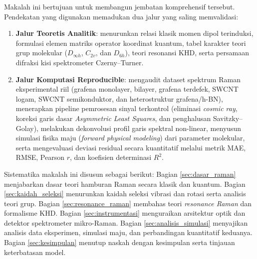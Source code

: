 Makalah ini bertujuan untuk membangun jembatan komprehensif tersebut. Pendekatan yang digunakan memadukan dua jalur yang saling memvalidasi:
\begin{enumerate}
    \item \textbf{Jalur Teoretis Analitik}: menurunkan relasi klasik momen dipol terinduksi, formulasi elemen matriks operator koordinat kuantum, tabel karakter teori grup molekular ($D_{\infty h}$, $C_{2v}$, dan $D_{6h}$), teori resonansi KHD, serta persamaan difraksi kisi spektrometer Czerny--Turner.
    \item \textbf{Jalur Komputasi Reproducible}: mengaudit dataset spektrum Raman eksperimental riil (grafena monolayer, bilayer, grafena terdefek, SWCNT logam, SWCNT semikonduktor, dan heterostruktur grafena/h-BN), menerapkan pipeline pemrosesan sinyal terkontrol (eliminasi \textit{cosmic ray}, koreksi garis dasar \textit{Asymmetric Least Squares}, dan penghalusan Savitzky--Golay), melakukan dekonvolusi profil garis spektral non-linear, menyusun simulasi fisika maju (\textit{forward physical modeling}) dari parameter molekular, serta mengevaluasi deviasi residual secara kuantitatif melalui metrik MAE, RMSE, Pearson $r$, dan koefisien determinasi $R^2$.
\end{enumerate}

Sistematika makalah ini disusun sebagai berikut: Bagian \ref{sec:dasar_raman} menjabarkan dasar teori hamburan Raman secara klasik dan kuantum. Bagian \ref{sec:kaidah_seleksi} menurunkan kaidah seleksi vibrasi dan rotasi serta analisis teori grup. Bagian \ref{sec:resonance_raman} membahas teori \textit{resonance Raman} dan formalisme KHD. Bagian \ref{sec:instrumentasi} menguraikan arsitektur optik dan detektor spektrometer mikro-Raman. Bagian \ref{sec:analisis_simulasi} menyajikan analisis data eksperimen, simulasi maju, dan perbandingan kuantitatif keduanya. Bagian \ref{sec:kesimpulan} menutup naskah dengan kesimpulan serta tinjauan keterbatasan model.
